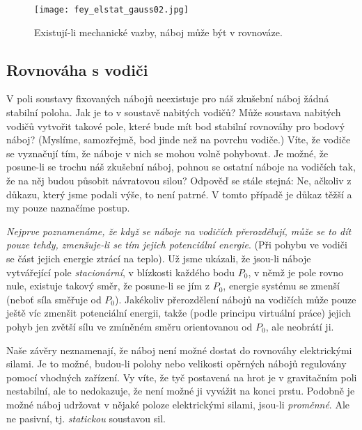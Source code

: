       \begin{figure}[ht!] %
        \centering
        \texttt{[image: fey\_elstat\_gauss02.jpg]}
        \caption{Existují-li mechanické vazby, náboj může být v rovnováze.}
        \label{fyz:fig_fey_elstat_gauss02}
      \end{figure}      
      
    \subsection{Rovnováha s vodiči}
      V poli soustavy fixovaných nábojů neexistuje pro náš zkušební náboj žádná stabilní poloha. Jak je to v 
      soustavě nabitých vodičů? Může soustava nabitých vodičů vytvořit takové pole, které bude mít bod 
      stabilní rovnováhy pro bodový náboj? (Myslíme, samozřejmě, bod jinde než na povrchu vodiče.) Víte, že 
      vodiče se vyznačují tím, že náboje v nich se mohou volně pohybovat. Je možné, že posune-li se trochu 
      náš zkušební náboj, pohnou se ostatní náboje na vodičích tak, že na něj budou působit návratovou silou? 
      Odpověď se stále stejná: Ne, ačkoliv z důkazu, který jsme podali výše, to není patrné. V tomto případě 
      je důkaz těžší a my pouze naznačíme postup.
      
      \emph{Nejprve poznamenáme, že když se náboje na vodičích přerozdělují, může se to dít pouze tehdy, 
      zmenšuje-li se tím jejich potenciální energie}. (Při pohybu ve vodiči se část jejich energie ztrácí na 
      teplo). Už jsme ukázali, že jsou-li náboje vytvářející pole \emph{stacionární}, v blízkosti každého 
      bodu \(P_0\), v němž je pole rovno nule, existuje takový směr, že posune-li se jím z \(P_0\), energie 
      systému se zmenší (neboť síla směřuje od \(P_0\)). Jakékoliv přerozdělení nábojů na vodičích může pouze 
      ještě víc zmenšit potenciální energii, takže (podle principu virtuální práce) jejich pohyb jen zvětší 
      sílu ve zmíněném směru orientovanou od \(P_0\), ale neobrátí ji.
      
      Naše závěry neznamenají, že náboj není možné dostat do rovnováhy elektrickými silami. Je to možné, 
      budou-li polohy nebo velikosti opěrných nábojů regulovány pomocí vhodných zařízení. Vy víte, že tyč 
      postavená na hrot je v gravitačním poli nestabilní, ale to nedokazuje, že není možné ji vyvážit na 
      konci prstu. Podobně je možné náboj udržovat v nějaké poloze elektrickými silami, jsou-li 
      \emph{proměnné}. Ale ne pasivní, tj. \emph{statickou} soustavou sil.
    
